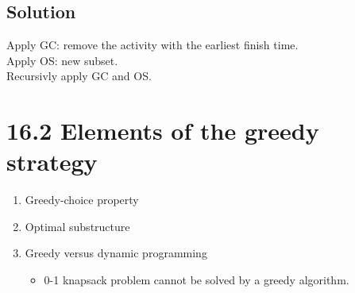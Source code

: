 \documentclass[a4paper]{article}
\begin{document}
\subsection*{Solution}
Apply GC: remove the activity with the earliest finish time.\\
Apply OS: new subset.\\
Recursivly apply GC and OS.

\section*{16.2 Elements of the greedy strategy}
    \begin{enumerate}
        \item Greedy-choice property
        \item Optimal substructure
        \item Greedy versus dynamic programming
            \begin{itemize}
                \item 0-1 knapsack problem cannot be solved by a greedy algorithm.
            \end{itemize}
    \end{enumerate}
\end{document}
